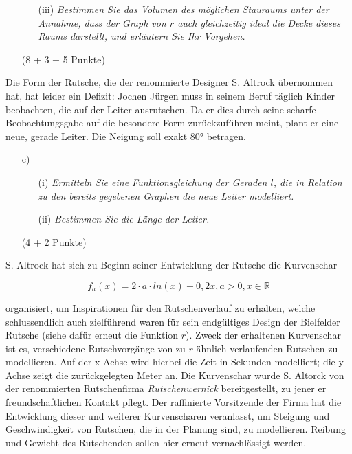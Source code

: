\documentclass[ngerman, a4paper, 11pt]{article}
\begin{document}
\begin{enumerate}[resume]
    \item[]
        \begin{enumerate}[resume]
            \item[(iii)]
                \textit{Bestimmen Sie das Volumen des möglichen Stauraums unter der Annahme,
                dass der Graph von $r$ auch gleichzeitig ideal die Decke dieses Raums darstellt,
                und erläutern Sie Ihr Vorgehen.}
        \end{enumerate}
        \begin{flushright}
            (8 + 3 + 5 Punkte)
        \end{flushright}
\end{enumerate}

Die Form der Rutsche, die der renommierte Designer S. Altrock übernommen hat, hat leider ein Defizit:
Jochen Jürgen muss in seinem Beruf täglich Kinder beobachten, die auf der Leiter ausrutschen.
Da er dies durch seine scharfe Beobachtungsgabe auf die besondere Form zurückzuführen meint, plant er eine neue, gerade Leiter.
Die Neigung soll exakt 80° betragen.

\begin{enumerate}[resume]
    \item[c)]
        \begin{enumerate}
            \item[(i)]
                \textit{Ermitteln Sie eine Funktionsgleichung der Geraden $l$,
                die in Relation zu den bereits gegebenen Graphen die neue Leiter modelliert.}
            \item[(ii)]
                \textit{Bestimmen Sie die Länge der Leiter.}
        \end{enumerate}
        \begin{flushright}
            (4 + 2 Punkte)
        \end{flushright}
\end{enumerate}

S. Altrock hat sich zu Beginn seiner Entwicklung der Rutsche die Kurvenschar

$$f_{a}(x)=2\cdot a\cdot ln(x)-0,2x,a>0,x\in \mathbb{R}$$

organisiert, um Inspirationen für den Rutschenverlauf zu erhalten, welche schlussendlich auch zielführend waren für sein endgültiges Design der Bielfelder Rutsche (siehe dafür erneut die Funktion $r$). Zweck der erhaltenen Kurvenschar ist es, verschiedene Rutschvorgänge von zu $r$ ähnlich verlaufenden Rutschen zu modellieren. Auf der x-Achse wird hierbei die Zeit in Sekunden modelliert; die y-Achse zeigt die zurückgelegten Meter an. Die Kurvenschar wurde S. Altorck von der renommierten Rutschenfirma \textit{Rutschenwernick} bereitgestellt, zu jener er freundschaftlichen Kontakt pflegt. Der raffinierte Vorsitzende der Firma hat die Entwicklung dieser und weiterer Kurvenscharen veranlasst, um Steigung und Geschwindigkeit von Rutschen, die in der Planung sind, zu modellieren. Reibung und Gewicht des Rutschenden sollen hier erneut vernachlässigt werden.
\end{document}
